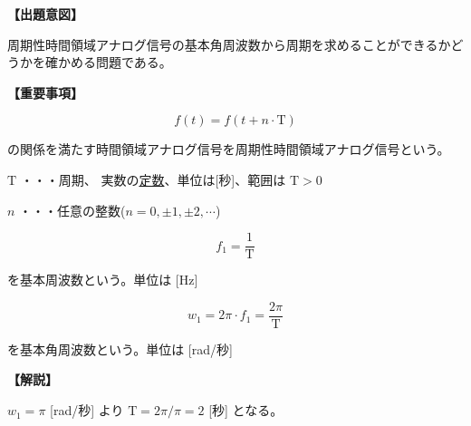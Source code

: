 \noindent \textbf{【出題意図】}

\noindent 周期性時間領域アナログ信号の基本角周波数から周期を求めることができるかどうかを確かめる問題である。

\vspace{1em}
\noindent \textbf{【重要事項】}

\[
f(t) = f(t + n \cdot \textrm{T})
\]

\noindent の関係を満たす時間領域アナログ信号を周期性時間領域アナログ信号という。

\medskip
\noindent $\textrm{T}$ ・・・周期、 実数の\underline{定数}、単位は[秒]、範囲は $\textrm{T} > 0$

\medskip
\noindent $n$ ・・・任意の整数($n = 0,\pm1,\pm2,\cdots$)

\[
f_1 = \frac{1}{\textrm{T}}
\]

\noindent を基本周波数という。単位は [Hz]

\[
w_1 = 2\pi \cdot f_1 = \frac{2\pi}{\textrm{T}}
\]

\noindent を基本角周波数という。単位は [rad/秒] 


\vspace{1em}
\noindent \textbf{【解説】}

\noindent $w_1 = \pi$ [rad/秒] より $\textrm{T}=2\pi/\pi = 2$ [秒] となる。
